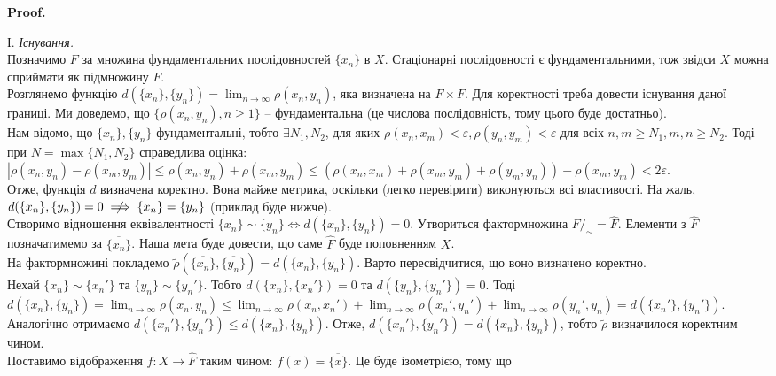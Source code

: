 \documentclass[a4paper, 10pt]{article}
\makeatletter
\theoremstyle{theoremdd}
\theoremstyle{theoremdd}
\theoremstyle{theoremdd}
\theoremstyle{theoremdd}
\theoremstyle{theoremdd}
\theoremstyle{theoremdd}
\theoremstyle{theoremdd}
\theoremstyle{theoremdd}
\renewenvironment{proof}[1][Proof.\\]{\par
\pushQED{\hfill \qed}%
\normalfont \topsep6\p@\@plus6\p@\relax
\trivlist
\item\relax
{\bfseries
#1\@addpunct{.}}\hspace\labelsep\ignorespaces
}{%
\popQED\endtrivlist\@endpefalse
}
\makeatother
\begin{document}
\begin{proof}
І. \textit{Існування.}\\
Позначимо $F$ за множина фундаментальних послідовностей $\{x_n\}$ в $X$. Стаціонарні послідовності є фундаментальними, тож звідси $X$ можна сприймати як підмножину $F$.\\
Розглянемо функцію $d(\{x_n\},\{y_n\}) = \displaystyle\lim_{n \to \infty} \rho(x_n,y_n)$, яка визначена на $F \times F$. Для коректності треба довести існування даної границі. Ми доведемо, що $\{ \rho(x_n,y_n), n \geq 1\}$ -- фундаментальна (це числова послідовність, тому цього буде достатньо).\\
Нам відомо, що $\{x_n\}, \{y_n\}$ фундаментальні, тобто $\exists N_1, N_2$, для яких $\rho(x_n,x_m) < \varepsilon, \rho(y_n,y_m) < \varepsilon$ для всіх $n,m \geq N_1, m,n \geq N_2$. Тоді при $N = \max \{N_1,N_2\}$ справедлива оцінка:\\
$|\rho(x_n,y_n) - \rho(x_m,y_m)| \leq \rho(x_n,y_n) + \rho(x_m,y_m) \leq (\rho(x_n,x_m) + \rho(x_m,y_m) + \rho(y_m,y_n)) - \rho(x_m,y_m) < 2 \varepsilon$.\\
Отже, функція $d$ визначена коректно. Вона майже метрика, оскільки (легко перевірити) виконуються всі властивості. На жаль, $d(\{x_n\},\{y_n\}) = 0 \centernot\implies \{x_n\} = \{y_n\}$ (приклад буде нижче).\\
Створимо відношення еквівалентності $\{x_n\} \sim \{y_n\} \iff d(\{x_n\},\{y_n\}) = 0$. Утвориться фактормножина $F/_{\sim} = \hat{F}$. Елементи з $\hat{F}$ позначатимемо за $\overline{\{x_n\}}$. Наша мета буде довести, що саме $\hat{F}$ буде поповненням $X$. \\
На фактормножині покладемо $\tilde{\rho}\left(\overline{\{x_n\}},\overline{\{y_n\}}\right) = d(\{x_n\},\{y_n\})$. Варто пересвідчитися, що воно визначено коректно.\\
Нехай $\{x_n\} \sim \{x_n'\}$ та $\{y_n\} \sim \{y_n'\}$. Тобто $d(\{x_n\},\{x_n'\}) = 0$ та $d(\{y_n\},\{y_n'\}) = 0$. Тоді\\
$d(\{x_n\},\{y_n\}) = \displaystyle\lim_{n \to \infty} \rho(x_n,y_n) \leq \lim_{n \to \infty} \rho(x_n,x_n') + \lim_{n \to \infty} \rho(x_n',y_n') + \lim_{n \to \infty} \rho(y_n',y_n) = d(\{x_n'\},\{y_n'\})$.\\
Аналогічно отримаємо $d(\{x_n'\},\{y_n'\}) \leq d(\{x_n\},\{y_n\})$. Отже, $d(\{x_n'\},\{y_n'\}) = d(\{x_n\},\{y_n\})$, тобто $\tilde{\rho}$ визначилося коректним чином.\\
Поставимо відображення $f \colon X \to \hat{F}$ таким чином: $f(x) = \overline{\{x\}}$. Це буде ізометрією, тому що\\

\end{proof}
\end{document}
